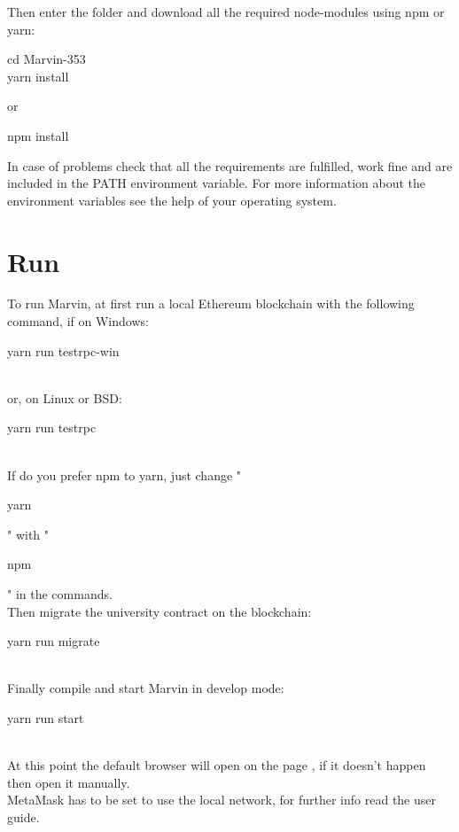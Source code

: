 \documentclass[ManualeSviluppatore]{subfiles}
\begin{document}
Then enter the folder and download all the required node-modules using npm or yarn: \\
\begin{ttfamily}
	cd Marvin-353 \\
	yarn install \\
\end{ttfamily}
or \\
\begin{ttfamily}
npm install \\
\end{ttfamily}

In case of problems check that all the requirements are fulfilled, work fine and are included in the PATH environment variable. For more information about the environment variables see the help of your operating system. \\


\section{Run}
To run Marvin, at first run a local Ethereum blockchain with the following command, if on Windows: \\
\begin{ttfamily} yarn run testrpc-win \end{ttfamily} \\
or, on Linux or BSD: \\
\begin{ttfamily} yarn run testrpc \end{ttfamily} \\
If do you prefer npm to yarn, just change "\begin{ttfamily}yarn\end{ttfamily}" with "\begin{ttfamily}npm\end{ttfamily}" in the commands.\\

Then migrate the university contract on the blockchain: \\
\begin{ttfamily} yarn run migrate \end{ttfamily} \\
Finally compile and start Marvin in develop mode: \\
\begin{ttfamily} yarn run start \end{ttfamily} \\

At this point the default browser will open on the page , if it doesn't happen then open it manually.\\
MetaMask has to be set to use the local network, for further info read the user guide.
\end{document}
